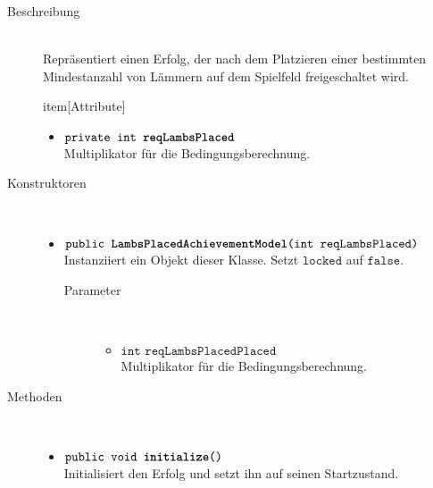 \begin{description}
\item[Beschreibung] \hfill \\ Repräsentiert einen Erfolg, der nach dem Platzieren einer bestimmten Mindestanzahl von Lämmern auf dem Spielfeld freigeschaltet wird.
	
item[Attribute] \hfill \\
	\vspace{-.8cm}
	\begin{itemize}
		\item $\texttt{private int \textbf{reqLambsPlaced}}$ \\ Multiplikator für die Bedingungsberechnung.
	\end{itemize}	
	
\item[Konstruktoren] \hfill \\
	\vspace{-.8cm}
	\begin{itemize}
		\item $\texttt{public \textbf{LambsPlacedAchievementModel}(int reqLambsPlaced)}$ \\ Instanziiert ein Objekt dieser Klasse. Setzt $\texttt{locked}$ auf $\texttt{false}$.
		\begin{description}
			\item[Parameter] \hfill \\
			\vspace{-.8cm}
			\begin{itemize}
				\item $\texttt{int reqLambsPlacedPlaced}$ \\ Multiplikator für die Bedingungsberechnung.
			\end{itemize}
		\end{description}
	\end{itemize}
	
\item[Methoden] \hfill \\
	\vspace{-.8cm}
	\begin{itemize}
		\item $\texttt{public void \textbf{initialize}()}$ \\ Initialisiert den Erfolg und setzt ihn auf seinen Startzustand.
		

\end{itemize}
\end{description}
